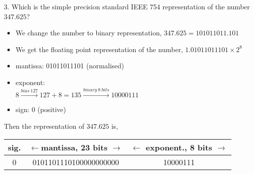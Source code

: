 \begin{paracol}{2}
3. Which is the simple precision standard IEEE 754 representation of the number \\ $347.625$?
\begin{itemize}[leftmargin=\dimexpr 26pt-.25in]
	\item  We change the number to binary representation, $347.625 = 101011011.101$
	\item  We get the floating point representation of the number, $1.01011011101\times 2^{8}$
	\item mantissa: 01011011101 (normalised)
	\item exponent:\\ $8 \xrightarrow{bias\ 127} 127+8=135  \xrightarrow{binary \ 8 \ bits} 10000111$
	\item sign: 0 (positive)
\end{itemize}
Then the representation of $347.625$ is, 
\end{paracol}
\begin{minipage}{\textwidth}
	\centering
\begin{tabular}{|c||c||c|}
\hline
sig.&$\leftarrow$mantissa, 23 bits $\rightarrow$&$\leftarrow$ exponent., 8 bits $\rightarrow$\\
\hline
0&0101101110100000000000&10000111\\
\hline
\end{tabular}\\
\end{minipage}

